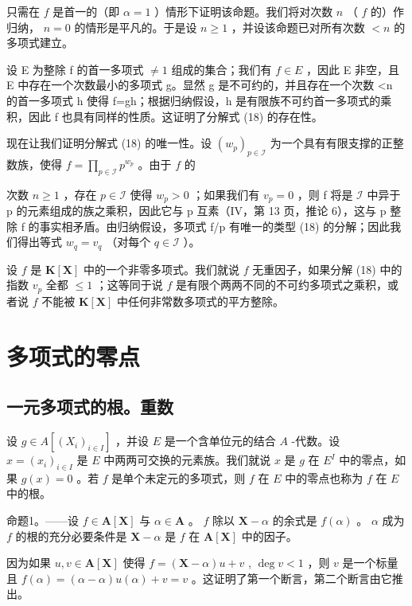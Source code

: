 只需在 \(f\) 是首一的（即 \(\alpha = 1\) ）情形下证明该命题。我们将对次数 \(n\) （ \(f\) 的）作归纳， \(n = 0\) 的情形是平凡的。于是设 \(n \geqslant 1\) ，并设该命题已对所有次数 \(< n\) 的多项式建立。

设 E 为整除 f 的首一多项式 \(\neq1\) 组成的集合；我们有 \(f\in E\) ，因此 E 非空，且 E 中存在一个次数最小的多项式 g。显然 g 是不可约的，并且存在一个次数 \textless n 的首一多项式 h 使得 f=gh；根据归纳假设，h 是有限族不可约首一多项式的乘积，因此 f 也具有同样的性质。这证明了分解式 (18) 的存在性。

现在让我们证明分解式 (18) 的唯一性。设 \((w_{p})_{p\in \mathcal{I}}\) 为一个具有有限支撑的正整数族，使得 \(f = \prod_{p\in \mathcal{I}}p^{w_p}\) 。由于 \(f\) 的

次数 \(n \geqslant 1\) ，存在 \(p \in \mathcal{I}\) 使得 \(w_{p} > 0\) ；如果我们有 \(v_{p} = 0\) ，则 f 将是 \(\mathcal{I}\) 中异于 p 的元素组成的族之乘积，因此它与 p 互素（IV，第 13 页，推论 6），这与 p 整除 f 的事实相矛盾。由归纳假设，多项式 f/p 有唯一的类型 (18) 的分解；因此我们得出等式 \(w_{q} = v_{q}\) （对每个 \(q \in \mathcal{I}\) ）。

设 \(f\) 是 \(\mathbf{K}[\mathbf{X}]\) 中的一个非零多项式。我们就说 \(f\) 无重因子，如果分解 (18) 中的指数 \(v_{p}\) 全都 \(\leqslant 1\) ；这等同于说 \(f\) 是有限个两两不同的不可约多项式之乘积，或者说 \(f\) 不能被 \(\mathbf{K}[\mathbf{X}]\) 中任何非常数多项式的平方整除。

\section{多项式的零点}

\subsection{一元多项式的根。重数}

设 \(g \in A[(X_i)_{i \in I}]\) ，并设 \(E\) 是一个含单位元的结合 \(A\) -代数。设 \(x = (x_i)_{i \in I}\) 是 \(E\) 中两两可交换的元素族。我们就说 \(x\) 是 \(g\) 在 \(E^{I}\) 中的零点，如果 \(g(x) = 0\) 。若 \(f\) 是单个未定元的多项式，则 \(f\) 在 \(E\) 中的零点也称为 \(f\) 在 \(E\) 中的根。

命题1。——设 \(f \in \mathbf{A}[\mathbf{X}]\) 与 \(\alpha \in \mathbf{A}\) 。 \(f\) 除以 \(\mathbf{X} - \alpha\) 的余式是 \(f(\alpha)\) 。 \(\alpha\) 成为 \(f\) 的根的充分必要条件是 \(\mathbf{X} - \alpha\) 是 \(f\) 在 \(\mathbf{A}[\mathbf{X}]\) 中的因子。

因为如果 \(u, v \in \mathbf{A}[\mathbf{X}]\) 使得 \(f = (\mathbf{X} - \alpha)u + v\) , \(\deg v < 1\) ，则 \(v\) 是一个标量且 \(f(\alpha) = (\alpha - \alpha)u(\alpha) + v = v\) 。这证明了第一个断言，第二个断言由它推出。

